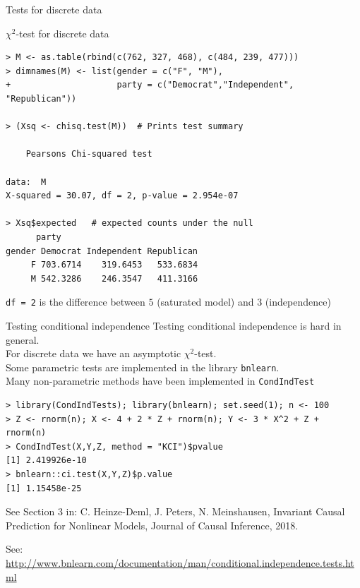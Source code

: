 \documentclass[dvipsnames,aspectratio=169]{beamer} %
\begin{document}
\begin{frame}[fragile]{Tests for discrete data}
	\begin{alertblock}{$\chi^2$-test for discrete data}
   \begin{lstlisting}
> M <- as.table(rbind(c(762, 327, 468), c(484, 239, 477)))
> dimnames(M) <- list(gender = c("F", "M"),
+                     party = c("Democrat","Independent", "Republican"))

> (Xsq <- chisq.test(M))  # Prints test summary

	Pearsons Chi-squared test

data:  M
X-squared = 30.07, df = 2, p-value = 2.954e-07
     
> Xsq$expected   # expected counts under the null
      party
gender Democrat Independent Republican
     F 703.6714    319.6453   533.6834
     M 542.3286    246.3547   411.3166
      \end{lstlisting}
\end{alertblock}
\texttt{df = 2} is the difference between $5$ (saturated model) and $3$ (independence)
\end{frame}



\begin{frame}[fragile]{Testing conditional independence}
Testing conditional independence is hard in general.\\[.2cm] For discrete data we have an asymptotic $\chi^2$-test.\\[.2cm]

Some parametric tests are implemented in the library \texttt{bnlearn}.\\
Many non-parametric methods have been implemented in \texttt{CondIndTest}
 \begin{lstlisting}
> library(CondIndTests); library(bnlearn); set.seed(1); n <- 100
> Z <- rnorm(n); X <- 4 + 2 * Z + rnorm(n); Y <- 3 * X^2 + Z + rnorm(n)
> CondIndTest(X,Y,Z, method = "KCI")$pvalue 
[1] 2.419926e-10
> bnlearn::ci.test(X,Y,Z)$p.value 
[1] 1.15458e-25
\end{lstlisting}
\medskip

{\scriptsize See Section 3 in: 
C. Heinze-Deml, J. Peters, N. Meinshausen, Invariant Causal Prediction for Nonlinear Models, Journal of Causal Inference, 2018.}
\bigskip

{\scriptsize See: \url{http://www.bnlearn.com/documentation/man/conditional.independence.tests.html}}
\end{frame}
\end{document}
